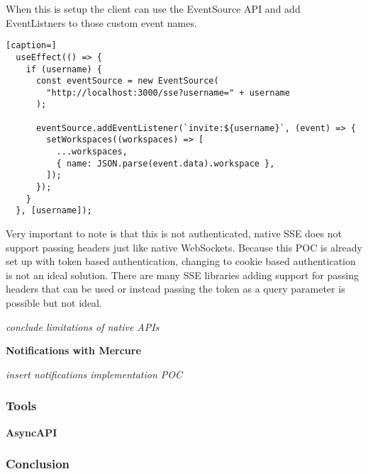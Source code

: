 When this is setup the client can use the EventSource API and add EventListners to those custom event names.

\begin{lstlisting}[caption=]
  useEffect(() => {
    if (username) {
      const eventSource = new EventSource(
        "http://localhost:3000/sse?username=" + username
      );
 
      eventSource.addEventListener(`invite:${username}`, (event) => {
        setWorkspaces((workspaces) => [
          ...workspaces,
          { name: JSON.parse(event.data).workspace },
        ]);
      });
    }
  }, [username]);
\end{lstlisting}

Very important to note is that this is not authenticated, native SSE does not support passing headers just like native WebSockets. Because this POC is already set up with token based authentication, changing to cookie based authentication is not an ideal solution. There are many SSE libraries adding support for passing headers that can be used or instead passing the token as a query parameter is possible but not ideal.

\textit{conclude limitations of native APIs}

\textbf{Notifications with Mercure}

\textit{insert notifications implementation POC}

\subsubsection{Tools}

\textbf{AsyncAPI}

\subsubsection{Conclusion}


